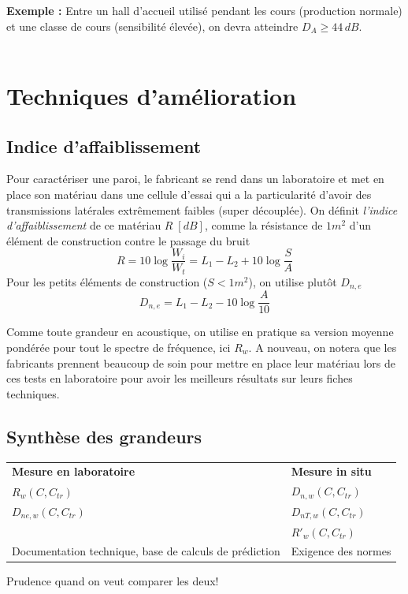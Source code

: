 \documentclass[11pt]{report}
\begin{document}
{{\textbf{Exemple :} Entre un hall d'accueil utilisé pendant les cours (production normale) et une classe de cours (sensibilité élevée), on devra atteindre $D_A \ge 44 \,dB$.\\

}}\\





\section{Techniques d'amélioration}
\subsection{Indice d'affaiblissement}
Pour caractériser une paroi, le fabricant se rend dans un laboratoire et met en place son matériau dans une cellule d'essai qui a la particularité d'avoir des transmissions latérales extrêmement faibles (super découplée). On définit \textit{l'indice d'affaiblissement} de ce matériau $R\;[dB]$, comme la résistance de $1m^2$ d'un élément de construction contre le passage du bruit
$$R = 10 \log \frac{W_i}{W_t} = L_1 - L_2 + 10 \log \frac{S}{A}$$
Pour les petits éléments de construction ($S<1m^2$), on utilise plutôt $D_{n,e}$
$$D_{n,e} = L_1 - L_2 - 10 \log \frac{A}{10}$$

Comme toute grandeur en acoustique, on utilise en pratique sa version moyenne pondérée pour tout le spectre de fréquence, ici $R_w$. A nouveau, on notera que les fabricants prennent beaucoup de soin pour mettre en place leur matériau lors de ces tests en laboratoire pour avoir les meilleurs résultats sur leurs fiches techniques.


\subsection{Synthèse des grandeurs}
\begin{center}
\begin{tabular}{C{6cm}C{6cm}}
\textbf{Mesure en laboratoire} & \textbf{Mesure in situ}\\
$R_w (C,C_{tr})$ & $D_{n,w}(C,C_{tr})$\\
$D_{ne,w}(C,C_{tr})$ & $D_{nT,w}(C,C_{tr})$\\
& $R'_w(C,C_{tr})$\\
Documentation technique, base de calculs de prédiction & Exigence des normes 
\end{tabular}
\end{center}
Prudence quand on veut comparer les deux!
\end{document}
